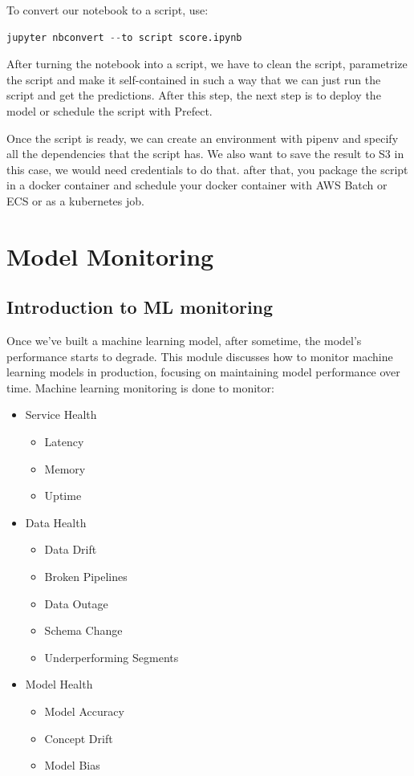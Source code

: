 \documentclass[letterpaper,12pt,notitlepage,twoside]{report}
\begin{document}
To convert our  notebook to a script, use: 
\begin{lstlisting}[language=python, numbers=none]
jupyter nbconvert --to script score.ipynb
\end{lstlisting}

After turning the notebook into a script, we have to clean the script, parametrize the script and make it self-contained in such a way that we can just run the script and get the predictions.  After this step, the next step is to deploy the model or schedule the script with Prefect.

Once the script is ready, we can create an environment with pipenv and specify all the dependencies that the script has. We also want to save the result to S3 in this case, we would need credentials to do that.  after that, you package the script in a docker container and schedule your docker container with AWS Batch or ECS or as a kubernetes job.


\chapter{Model Monitoring} \label{ch:5}
\section{Introduction to ML monitoring}
Once we've built a machine learning model, after sometime, the model's performance starts to degrade.  This module discusses how to monitor machine learning models in production, focusing on maintaining model performance over time. Machine learning monitoring is done to monitor:
\begin{itemize}[noitemsep, topsep=0pt]
\item Service Health
	\begin{itemize}
		\item Latency
		\item Memory
		\item Uptime
	\end{itemize}
\item Data Health
	\begin{itemize}
		\item Data Drift
		\item Broken Pipelines
		\item Data Outage
		\item Schema Change
		\item Underperforming Segments
	\end{itemize}
\item Model Health
	\begin{itemize}
		\item Model Accuracy
		\item Concept Drift
		\item Model Bias
	\end{itemize}
\end{itemize}
\end{document}
